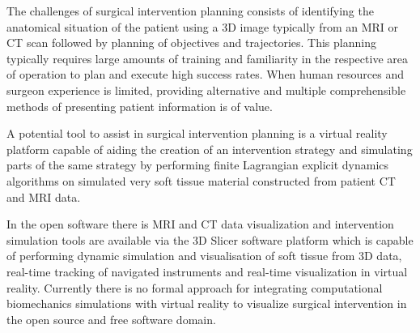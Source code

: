 



The challenges of surgical intervention planning consists of identifying the anatomical situation of the patient using a 3D image typically from an MRI or CT scan followed by planning of objectives and trajectories. This planning typically requires large amounts of training and familiarity in the respective area of operation to plan and execute high success rates. When human resources and surgeon experience is limited, providing alternative and multiple comprehensible methods of presenting patient information is of value.


A potential tool to assist in surgical intervention planning is a virtual reality platform capable of aiding the creation of an intervention strategy and simulating parts of the same strategy by performing finite Lagrangian explicit dynamics algorithms on simulated very soft tissue material constructed from patient CT and MRI data.



In the open software there is MRI and CT data visualization and intervention simulation tools are available via the 3D Slicer software platform which is capable of performing dynamic simulation and visualisation of soft tissue from 3D data, real-time tracking of navigated instruments \cite{Ungi2016} and real-time visualization in virtual reality.
Currently there is no formal approach for integrating computational biomechanics simulations with virtual reality to visualize surgical intervention in the open source and free software domain.

